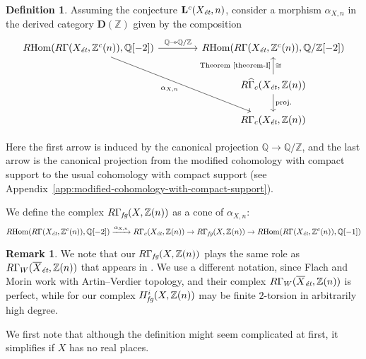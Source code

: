 \documentclass{article}
\DeclareMathOperator{\Hom}{Hom}
\newcommand{\QQ}{\mathbb{Q}}
\newcommand{\ZZ}{\mathbb{Z}}
\newcommand{\et}{\text{\it ét}}
\newcommand{\fg}{\text{\it fg}}
\newcommand{\RHom}{R\!\Hom}
\theoremstyle{definition}
\newtheorem{definition}[theorem]{Definition}
\newtheorem{remark}[theorem]{Remark}
\numberwithin{equation}{section}
\begin{document}
\begin{definition}
  \label{def:RGamma-fg}
  Assuming the conjecture $\mathbf{L}^c (X_\et,n)$, consider a morphism
  $\alpha_{X,n}$ in the derived category $\mathbf{D} (\ZZ)$ given by the
  composition
  \[ \begin{tikzcd}[column sep=4em]
    \RHom (R\Gamma (X_\et, \ZZ^c (n)), \QQ[-2]) \ar{r}{\QQ \twoheadrightarrow \QQ/\ZZ}\ar{ddr}[swap]{\alpha_{X,n}} & \RHom (R\Gamma (X_\et, \ZZ^c (n)), \QQ/\ZZ[-2]) \\
    & R\widehat{\Gamma}_c (X_\et, \ZZ (n)) \ar{u}{\text{Theorem \ref{theorem-I}}}[swap]{\cong} \ar{d}{\text{proj.}} \\
    & R\Gamma_c (X_\et, \ZZ (n))
  \end{tikzcd} \]

  Here the first arrow is induced by the canonical projection $\QQ \to \QQ/\ZZ$,
  and the last arrow is the canonical projection from the modified cohomology
  with compact support to the usual cohomology with compact support
  (see Appendix~\ref{app:modified-cohomology-with-compact-support}).

  We define the complex $R\Gamma_\fg (X, \ZZ(n))$ as a cone of $\alpha_{X,n}$:
  \[ \RHom (R\Gamma (X_\et, \ZZ^c (n)), \QQ [-2]) \xrightarrow{\alpha_{X,n}}
  R\Gamma_c (X_\et, \ZZ (n)) \to
  R\Gamma_\fg (X, \ZZ(n)) \to
  \RHom (R\Gamma (X_\et, \ZZ^c (n)), \QQ [-1]) \]
\end{definition}

\begin{remark}
  We note that our $R\Gamma_\fg (X, \ZZ (n))$ plays the same role as
  $R\Gamma_W (\overline{X}_\et, \ZZ (n))$ that appears in
  \cite[Definition~3.6]{Flach-Morin-2018}. We use a different notation, since
  Flach and Morin work with Artin--Verdier topology, and their complex
  $R\Gamma_W (\overline{X}_\et, \ZZ (n))$ is perfect, while for our complex
  $H^i_\fg (X, \ZZ (n))$ may be finite $2$-torsion in arbitrarily high degree.
\end{remark}

We first note that although the definition might seem complicated at first,
it simplifies if $X$ has no real places.
\end{document}
